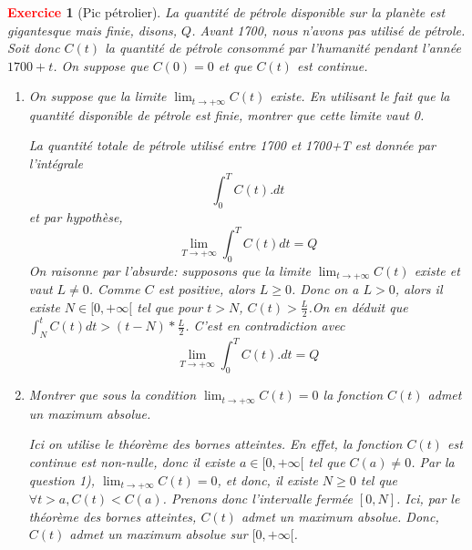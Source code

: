 \documentclass[11pt]{article}
\theoremstyle{mythmstyle}
\newtheorem{exo}{\textcolor{red}{\textbf{Exercice}}}
\begin{document}
\begin{exo}[Pic pétrolier]
La quantité de pétrole disponible sur la planète est gigantesque mais finie, disons, $Q$. Avant 1700, nous n'avons pas utilisé de pétrole. Soit  donc  $C(t)$ la quantité de pétrole consommé  par l'humanité pendant l'année $1700+t$. On suppose que  $C(0)=0$ et que $C(t)$ est continue.
\begin{enumerate}
    \item On suppose que la limite $\lim_{t\to +\infty} C(t)$ existe. En utilisant le fait que la quantité disponible de pétrole est finie, montrer que cette limite vaut 0.
   
   
  \begin{solution}
  La quantité totale de pétrole utilisé entre 1700 et 1700+T est donnée par l'intégrale
    $$
    \int_{0}^T C(t).dt
    $$
    et par hypothèse, 
    $$
    \lim_{T\to +\infty}\int_{0}^T C(t)dt=Q
    $$
    On raisonne par l'absurde:
 supposons que la limite $\lim_{t\to +\infty} C(t)$ existe et  vaut $L \neq 0$. Comme $C$ est positive, alors $L\geq 0$. Donc on a $L>0$, alors il existe $N\in [0, +\infty[$ tel que pour $t>N$, $C(t)>\frac L2$.On en déduit que $\int_{N}^{t}C(t)dt> (t-N)*\frac L2$. C'est en contradiction avec  $$
    \lim_{T\to +\infty}\int_{0}^T C(t).dt=Q
    $$
\end{solution}
    
    
 \item Montrer que sous la condition $\lim_{t\to +\infty} C(t)=0$ la fonction $C(t)$ admet un maximum absolue.
 
\begin{solution}
  Ici on utilise le théorème des bornes atteintes. En effet, la fonction $C(t)$ est continue est non-nulle, donc il existe $a\in [0, +\infty[$ tel que $C(a)\neq 0$. Par la question 1), $\lim_{t\to +\infty} C(t)=0$, et donc, il existe $N\geq 0$ tel que $\forall t> a, C(t)< C(a)$. Prenons donc l'intervalle fermée $[0, N]$. Ici, par le théorème des bornes atteintes, $C(t)$ admet un maximum absolue. Donc, $C(t)$ admet un maximum absolue sur $[0, +\infty[$.
\end{solution}
 
  \end{enumerate}  
\end{exo}
  
\medskip
\end{document}
